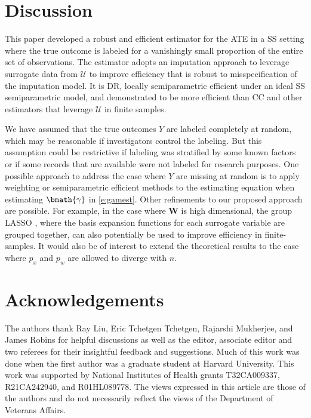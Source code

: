 \documentclass[useAMS,referee,usenatbib]{biom}
\def\bW{\mathbf{W}}
\def\bgam{\bmath{\gamma}}
\def\Uscr{\mathscr{U}}
\begin{document}
\section{Discussion}
\label{s:discuss}

This paper developed a robust and efficient estimator for the ATE in a SS setting where the true outcome is labeled
for a vanishingly small proportion of the entire set of observations.
The estimator adopts an imputation approach to leverage surrogate data from $\Uscr$ to improve efficiency that is robust to
misspecification of the imputation model.  
It is DR, locally semiparametric efficient under an ideal SS semiparametric model, and demonstrated to be more efficient
than CC and other estimators that leverage $\Uscr$ in finite samples.

We have assumed that the true outcomes $Y$ are labeled completely at random, which may be reasonable if investigators control the labeling.  But this assumption could be restrictive if labeling was stratified by some known factors or if some records that are available were not labeled for research purposes.
One possible approach to address the case where $Y$ are missing at random is to apply weighting or semiparametric efficient methods \citep{robins1994estimation} to the estimating equation when estimating $\bgam$ in \eqref{e:gamest}.  
Other refinements to our proposed approach are possible.  For example, in the case where $\bW$ is high dimensional, the 
group LASSO  \citep{yuan2006model}, where the basis expansion functions for each  surrogate variable are grouped together, 
can also potentially be used to improve efficiency in finite-samples.  It would also be of interest to extend the theoretical results to the case where $p_x$ and $p_w$ are allowed to diverge with $n$.

\backmatter

\section*{Acknowledgements}

The authors thank Ray Liu, Eric Tchetgen Tchetgen, Rajarshi Mukherjee, and James Robins for helpful discussions as well as 
the editor, associate editor and two referees for their insightful feedback and suggestions.  
Much of this work was done when the first author was a graduate student at Harvard University.  This work was supported 
by National Institutes of Health grants T32CA009337, R21CA242940, and R01HL089778.
The views expressed in this article are those of the authors and do not necessarily reflect the views of the Department of Veterans Affairs.
\vspace*{-8pt}
\end{document}
